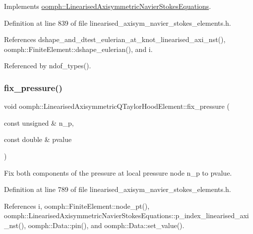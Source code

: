 Implements \hyperlink{classoomph_1_1LinearisedAxisymmetricNavierStokesEquations_a0c2247614d1d1414dc53cde8e755e836}{oomph\+::\+Linearised\+Axisymmetric\+Navier\+Stokes\+Equations}.



Definition at line 839 of file linearised\+\_\+axisym\+\_\+navier\+\_\+stokes\+\_\+elements.\+h.



References dshape\+\_\+and\+\_\+dtest\+\_\+eulerian\+\_\+at\+\_\+knot\+\_\+linearised\+\_\+axi\+\_\+nst(), oomph\+::\+Finite\+Element\+::dshape\+\_\+eulerian(), and i.



Referenced by ndof\+\_\+types().

\mbox{\label{classoomph_1_1LinearisedAxisymmetricQTaylorHoodElement_a2ab848b1e9ed7c950071e7bd7ad9d39d}} 
\subsubsection{\texorpdfstring{fix\+\_\+pressure()}{fix\_pressure()}}
{\footnotesize\ttfamily void oomph\+::\+Linearised\+Axisymmetric\+Q\+Taylor\+Hood\+Element\+::fix\+\_\+pressure (\begin{DoxyParamCaption}\item[{const unsigned \&}]{n\+\_\+p,  }\item[{const double \&}]{pvalue }\end{DoxyParamCaption})\hspace{0.3cm}{\ttfamily [inline]}}



Fix both components of the pressure at local pressure node n\+\_\+p to pvalue. 



Definition at line 789 of file linearised\+\_\+axisym\+\_\+navier\+\_\+stokes\+\_\+elements.\+h.



References i, oomph\+::\+Finite\+Element\+::node\+\_\+pt(), oomph\+::\+Linearised\+Axisymmetric\+Navier\+Stokes\+Equations\+::p\+\_\+index\+\_\+linearised\+\_\+axi\+\_\+nst(), oomph\+::\+Data\+::pin(), and oomph\+::\+Data\+::set\+\_\+value().

